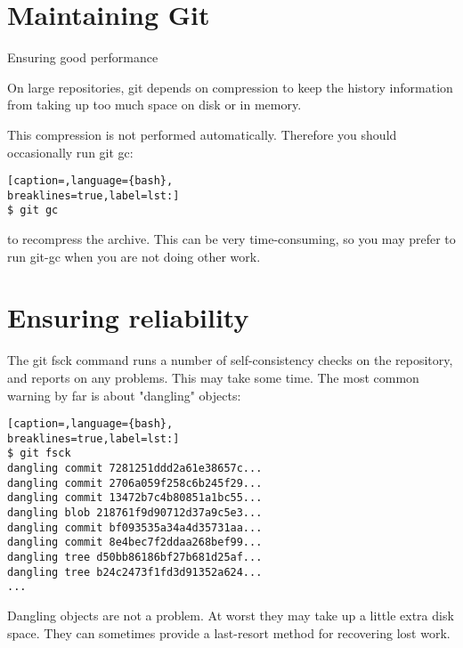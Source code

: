 \section{Maintaining Git}
Ensuring good performance

On large repositories, git depends on compression to keep the history
information from taking up too much space on disk or in memory.

This compression is not performed automatically. Therefore you should
occasionally run git gc:
\lstset{basicstyle=\scriptsize, numbers=none, captionpos=b, tabsize=4}
\begin{lstlisting}[caption=,language={bash},
breaklines=true,label=lst:]
$ git gc
\end{lstlisting}

to recompress the archive. This can be very time-consuming, so you may prefer
to run git-gc when you are not doing other work.

\section{Ensuring reliability}
The git fsck command runs a number of self-consistency checks on the
repository, and reports on any problems. This may take some time. The most
common warning by far is about "dangling" objects:
\lstset{basicstyle=\scriptsize, numbers=none, captionpos=b, tabsize=4}
\begin{lstlisting}[caption=,language={bash},
breaklines=true,label=lst:]
$ git fsck
dangling commit 7281251ddd2a61e38657c...
dangling commit 2706a059f258c6b245f29...
dangling commit 13472b7c4b80851a1bc55...
dangling blob 218761f9d90712d37a9c5e3...
dangling commit bf093535a34a4d35731aa...
dangling commit 8e4bec7f2ddaa268bef99...
dangling tree d50bb86186bf27b681d25af...
dangling tree b24c2473f1fd3d91352a624...
...
\end{lstlisting}

Dangling objects are not a problem. At worst they may take up a little extra
disk space. They can sometimes provide a last-resort method for recovering lost
work.

